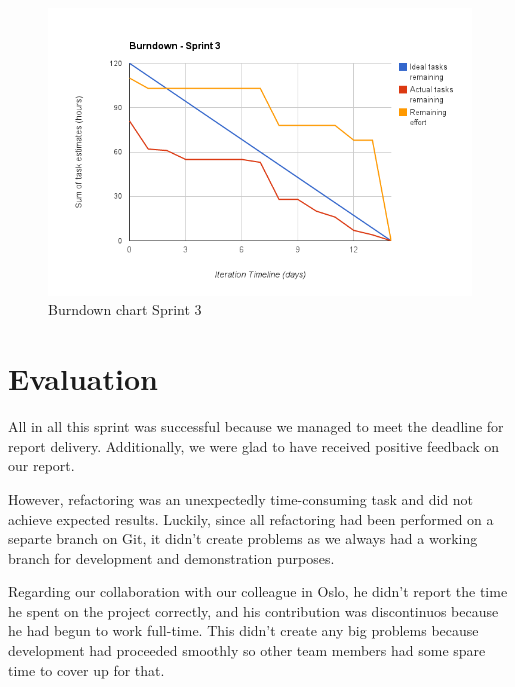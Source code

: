 \begin{figure}[h]
\centering
\includegraphics[scale=0.60]{../Figures/burndownSprint3.png}
\caption{Burndown chart Sprint 3}
\label{figure:burndownsprint3}
\end{figure}

\section{Evaluation}

All in all this sprint was successful because we managed to meet the deadline for report delivery.
Additionally, we were glad to have received positive feedback on our report.

However, refactoring was an unexpectedly time-consuming task and did not achieve expected results.
Luckily, since all refactoring had been performed on a separte branch on Git, it didn't create
problems as we always had a working branch for development and demonstration purposes.

Regarding our collaboration with our colleague in Oslo, he didn't report the time he spent on the
project correctly, and his contribution was discontinuos because he had begun to work full-time.
This didn't create any big problems because development had proceeded smoothly so other
team members had some spare time to cover up for that.

